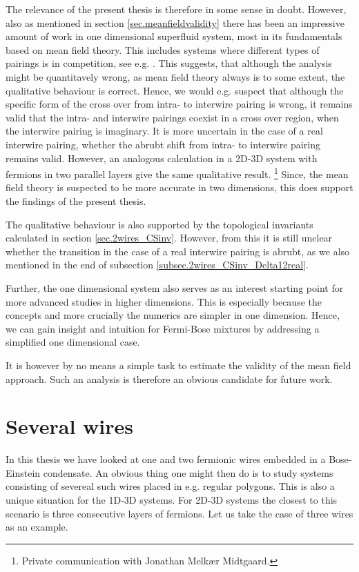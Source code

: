 The relevance of the present thesis is therefore in some sense in doubt. However, also as mentioned in section \ref{sec.meanfieldvalidity} there has been an impressive amount of work in one dimensional superfluid system, most in its fundamentals based on mean field theory. This includes systems where different types of pairings is in competition, see e.g. \cite{LiYangChen}. This suggests, that although the analysis might be quantitavely wrong, as mean field theory always is to some extent, the qualitative behaviour is correct. Hence, we would e.g. suspect that although the specific form of the cross over from intra- to interwire pairing is wrong, it remains valid that the intra- and interwire pairings coexist in a cross over region, when the interwire pairing is imaginary. It is more uncertain in the case of a real interwire pairing, whether the abrubt shift from intra- to interwire pairing remains valid. However, an analogous calculation in a 2D-3D system with fermions in two parallel layers give the same qualitative result. \footnote{Private communication with Jonathan Melk{\ae}r Midtgaard.} Since, the mean field theory is suspected to be more accurate in two dimensions, this does support the findings of the present thesis. 

The qualitative behaviour is also supported by the topological invariants calculated in section \ref{sec.2wires_CSinv}. However, from this it is still unclear whether the transition in the case of a real interwire pairing is abrubt, as we also mentioned in the end of subsection \ref{subsec.2wires_CSinv_Delta12real}. 

Further, the one dimensional system also serves as an interest starting point for more advanced studies in higher dimensions. This is especially because the concepts and more crucially the numerics are simpler in one dimension. Hence, we can gain insight and intuition for Fermi-Bose mixtures by addressing a simplified one dimensional case. 

It is however by no means a simple task to estimate the validity of the mean field approach. Such an analysis is therefore an obvious candidate for future work.

\section{Several wires}
In this thesis we have looked at one and two fermionic wires embedded in a Bose-Einstein condensate. An obvious thing one might then do is to study systems consisting of severeal such wires placed in e.g. regular polygons. This is also a unique situation for the 1D-3D systems. For 2D-3D systems the closest to this scenario is three consecutive layers of fermions. Let us take the case of three wires as an example. 

